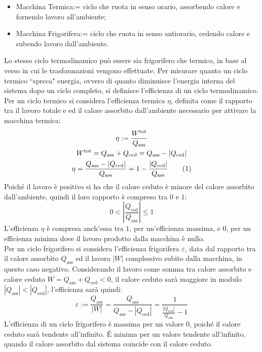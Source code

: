 \documentclass{article}
\numberwithin{equation}{subsection}
\begin{document}
\begin{itemize}
    \item Macchina Termica:= ciclo che ruota in senso orario, 
    assorbendo calore e fornendo lavoro all'ambiente;
    \item Macchina Frigorifera:= ciclo che ruota in senso 
    antiorario, cedendo calore e subendo lavoro dall'ambiente.
\end{itemize}
Lo stesso ciclo termodinamico può essere sia frigorifero che 
termico, in base al verso in cui le trasformazioni vengono 
effettuate. Per misurare quanto un ciclo termico ``spreca" 
energia, ovvero di quanto diminuisce l'energia interna del 
sistema dopo un ciclo completo, si definisce l'efficienza di 
un ciclo termodinamico. 
Per un ciclo termico si considera l'efficienza termica $\eta$, 
definita come il rapporto tra il lavoro totale e ed il 
calore assorbito dall'ambiente necessario per attivare la 
macchina termica:
\begin{gather*}
    \eta:=\displaystyle\frac{W^\mathrm{tot}}{Q_\mathrm{ass}}\\
    W^\mathrm{tot}=Q_\mathrm{ass}+Q_\mathrm{ced}=Q_\mathrm{ass}-\left|Q_\mathrm{ced}\right|\\
    \eta=\displaystyle\frac{Q_\mathrm{ass}-\left|Q_\mathrm{ced}\right|}{Q_\mathrm{ass}}=1-\frac{\left|Q_\mathrm{ced}\right|}{Q_\mathrm{ass}}\tag{\stepcounter{equation}\theequation}
\end{gather*}
Poiché il lavoro è positivo si ha che il calore ceduto  
è minore del calore assorbito dall'ambiente, quindi il loro 
rapporto è compreso tra $0$ e $1$: 
\begin{equation*}
    0<\left|\displaystyle\frac{Q_\mathrm{ced}}{Q_\mathrm{ass}}\right|\leq1
\end{equation*}
L'efficienza $\eta$ è compresa anch'essa tra $1$, per 
un'efficienza massima, e $0$, per un efficienza minima dove il 
lavoro prodotto dalla macchina è nullo.
\\
Per un ciclo frigorifero si considera l'efficienza frigorifera $\varepsilon$, 
data dal rapporto tra il calore assorbito $Q_\mathrm{ass}$ ed il lavoro 
$\left|W\right|$ complessivo subito dalla macchina, in questo caso negativo. 
Considerando il lavoro come somma tra calore assorbito e calore 
ceduto $W=Q_\mathrm{ass}+Q_\mathrm{ced}<0$, il calore ceduto sarà maggiore in modulo 
$\left|Q_\mathrm{ass}\right|<\left|Q_\mathrm{ced}\right|$, l'efficienza sarà 
quindi:
\begin{equation}
    \varepsilon:=\displaystyle\frac{Q_\mathrm{ass}}{\left|W\right|}=\displaystyle\frac{Q_\mathrm{ass}}{Q_\mathrm{ass}-\left|Q_\mathrm{ced}\right|}=\frac{1}{\displaystyle\frac{|Q_\mathrm{ced}|}{Q_\mathrm{ass}}-1}
\end{equation}
L'efficienza di un ciclo frigorifero è massima per un valore $0$, poiché il calore 
ceduto sarà tendente all'infinito. \'{E} minima 
per un valore tendente all'infinito, quando il calore assorbito 
dal sistema coincide con il calore ceduto. 
\end{document}
